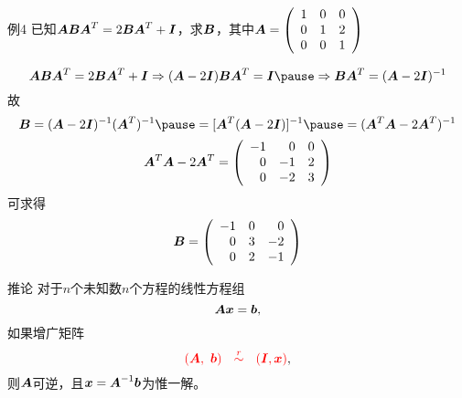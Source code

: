 \begin{frame}
  \begin{footnotesize}
    \begin{exampleblock}{例4}
      已知$\boldsymbol{A}\boldsymbol{B}\boldsymbol{A}^T=2\boldsymbol{B}\boldsymbol{A}^T+\boldsymbol{I}$，求$\boldsymbol{B}$，其中$
      \boldsymbol{A} = \left(
      \begin{array}{ccc}
        1&0&0\\
        0&1&2\\
        0&0&1
      \end{array}
      \right)
      $
    \end{exampleblock}
    \pause
    \proofname
    $$
    \A\B\A^T=2\B\A^T+\II \Rightarrow (\A-2\II)\B\A^T=\II \pause
    \Rightarrow \B\A^T = (\A-2\II)^{-1}
    $$
    \pause 
    故
    $$
    \B = (\A-2\II)^{-1} (\A^T)^{-1} \pause = [\A^T(\A-2\II)]^{-1} \pause
    =(\A^T\A-2\A^T)^{-1}
    $$
    \pause
    $$
    \boldsymbol{A}^T\boldsymbol{A}-2\boldsymbol{A}^T = \left(
    \begin{array}{rrr}
      -1&0&0\\
      0&-1&2\\
      0&-2&3
    \end{array}
    \right)
    $$\pause 
    可求得
    $$
    \boldsymbol{B} = \left(
    \begin{array}{rrr}
      -1&0&0\\
      0&3&-2\\
      0&2&-1
    \end{array}
    \right)
    $$
  \end{footnotesize}
\end{frame}

\begin{frame}
  \begin{footnotesize}
    \begin{block}{推论}
      对于$n$个未知数$n$个方程的线性方程组
      $$
      \boldsymbol{A}{\boldsymbol{x}}={\boldsymbol{b}},
      $$
      如果增广矩阵
      $$
      \textcolor{red}{(\boldsymbol{A},~{\boldsymbol{b}})~~\overset{r}{\sim}~~(\boldsymbol{I},{\boldsymbol{x}})},
      $$
      则$\boldsymbol{A}$可逆，且${\boldsymbol{x}}=\boldsymbol{A}^{-1}{\boldsymbol{b}}$为惟一解。
      
    \end{block}
  \end{footnotesize}
\end{frame}


